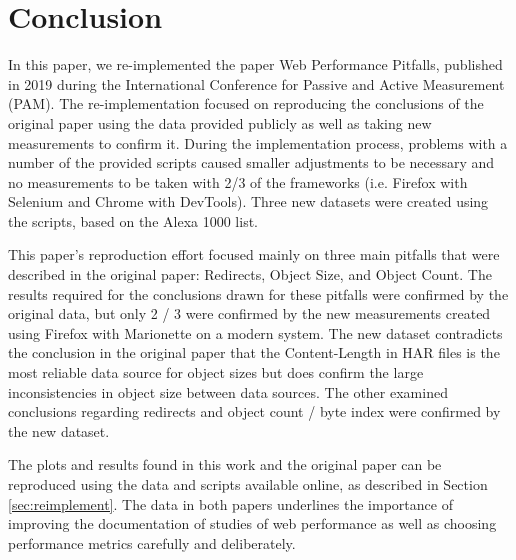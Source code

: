\section{Conclusion}
In this paper, we re-implemented the paper Web Performance Pitfalls, published in 2019 during the International Conference for Passive and Active Measurement (PAM). The re-implementation focused on reproducing the conclusions of the original paper using the data provided publicly as well as taking new measurements to confirm it. During the implementation process, problems with a number of the provided scripts caused smaller adjustments to be necessary and no measurements to be taken with 2/3 of the frameworks (i.e. Firefox with Selenium and Chrome with DevTools). Three new datasets were created using the scripts, based on the Alexa 1000 list.

This paper's reproduction effort focused mainly on three main pitfalls that were described in the original paper: Redirects, Object Size, and Object Count. The results required for the conclusions drawn for these pitfalls were confirmed by the original data, but only 2 / 3 were confirmed by the new measurements created using Firefox with Marionette on a modern system. The new dataset contradicts the conclusion in the original paper that the Content-Length in HAR files is the most reliable data source for object sizes but does confirm the large inconsistencies in object size between data sources. The other examined conclusions regarding redirects and object count / byte index were confirmed by the new dataset.

The plots and results found in this work and the original paper can be reproduced using the data and scripts available online, as described in Section \ref{sec:reimplement}. The data in both papers underlines the importance of improving the documentation of studies of web performance as well as choosing performance metrics carefully and deliberately.